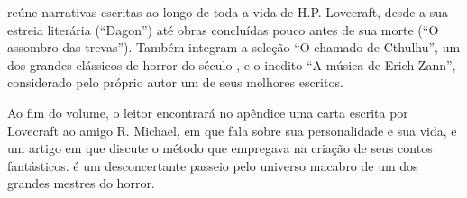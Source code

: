 \hspace*{-7cm}\hrulefill\hspace*{-7cm}

\medskip

 reúne narrativas escritas ao longo de toda a vida de H.P. Lovecraft, desde a sua estreia literária (“Dagon”) até obras concluídas pouco antes de sua morte (“O assombro das trevas”). Também integram a seleção
“O chamado de Cthulhu”, um dos grandes clássicos de horror do século , e o inedito “A música de Erich Zann”, considerado pelo próprio autor um de seus melhores escritos.

Ao fim do volume, o leitor encontrará no apêndice uma carta escrita por
Lovecraft ao amigo R. Michael, em que fala sobre sua personalidade e sua vida, e um artigo em que discute o método que empregava na criação de seus contos fantásticos. {} é um desconcertante passeio pelo universo macabro de um dos grandes mestres do horror.

\vfill

\hspace*{-.4cm}\begin{minipage}[c]{.5\linewidth}
\small{
{}}
\end{minipage}

\pagebreak


